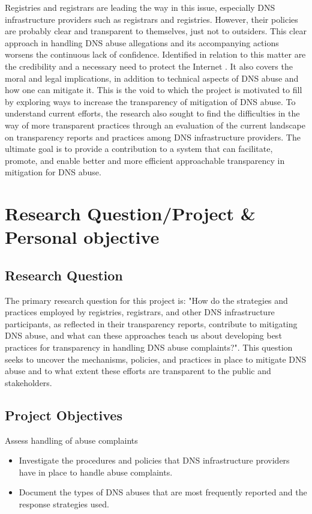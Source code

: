 Registries and registrars are leading the way in this issue, especially DNS infrastructure providers such as registrars and registries. However, their policies are probably clear and transparent to themselves, just not to outsiders.  This clear approach in handling DNS abuse allegations and its accompanying actions worsens the continuous lack of confidence. Identified in relation to this matter are the credibility and a necessary need to protect the Internet \cite{cerf2022}. It also covers the moral and legal implications, in addition to technical aspects of DNS abuse and how one can mitigate it. This is the void to which the project is motivated to fill by exploring ways to increase the transparency of mitigation of DNS abuse. To understand current efforts, the research also sought to find the difficulties in the way of more transparent practices through an evaluation of the current landscape on transparency reports and practices among DNS infrastructure providers. The ultimate goal is to provide a contribution to a system that can facilitate, promote, and enable better and more efficient approachable transparency in mitigation for DNS abuse.


\section{Research Question/Project \& Personal objective} 
\subsection{Research Question}

The primary research question for this project is: "How do the strategies and practices employed by registries, registrars, and other DNS infrastructure participants, as reflected in their transparency reports, contribute to mitigating DNS abuse, and what can these approaches teach us about developing best practices for transparency in handling DNS abuse complaints?". This question seeks to uncover the mechanisms, policies, and practices in place to mitigate DNS abuse and to what extent these efforts are transparent to the public and stakeholders.

\subsection{Project Objectives}

Assess handling of abuse complaints

\begin{itemize}
  \item Investigate the procedures and policies that DNS infrastructure providers have in place to handle abuse complaints.
  \item Document the types of DNS abuses that are most frequently reported and the response strategies used.
\end{itemize}

